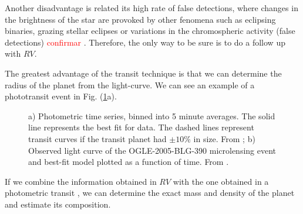 \documentclass[dvips,12pt,a4paper]{report}
\begin{document}
Another disadvantage is related its high rate of false detections, where changes in the brightness of the star are provoked by other fenomena such as eclipsing binaries, grazing stellar eclipses or variations in the chromospheric activity (false detections) \textcolor{red}{confirmar} . Therefore, the only way to be sure is to do a follow up with $RV$. 

The greatest advantage of the transit technique is that we can determine the radius of the planet from the light-curve. We can see an example of a phototransit event in Fig. (\ref{photot}a). 

\begin{figure}[h]
\centering
{}
\caption[Example of a phototransit and microlensing event]{a) Photometric time series, binned into 5 minute averages. The solid line represents the best fit for data. The dashed lines represent transit curves if the transit planet had $\pm10\%$ in size. From \citet{Charbonneau-2000}; b) Observed light curve of the OGLE-2005-BLG-390 microlensing event and best-fit model plotted as a function of time. From \citet{Beaulieu-2006}.}
\label{photot}
\end{figure}

If we combine the information obtained in $RV$ with the one obtained in a photometric transit \citep{Charbonneau-2000}, we can determine the exact mass and density of the planet and estimate its composition.
\end{document}
